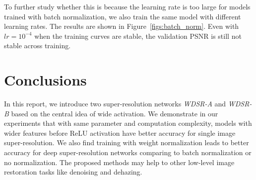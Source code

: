 \documentclass{article}
\begin{document}
To further study whether this is because the learning rate is too large for models trained with batch normalization, we also train the same model with different learning rates. The results are shown in Figure~\ref{figs:batch_norm}. Even with \(lr = 10^{-4}\) when the training curves are stable, the validation PSNR is still not stable across training.  
\section{Conclusions}

In this report, we introduce two super-resolution networks \textit{WDSR-A} and \textit{WDSR-B} based on the central idea of wide activation. We demonstrate in our experiments that with same parameter and computation complexity, models with wider features before ReLU activation have better accuracy for single image super-resolution. We also find training with weight normalization leads to better accuracy for deep super-resolution networks comparing to batch normalization or no normalization. The proposed methods may help to other low-level image restoration tasks like denoising and dehazing.

\printbibliography
\end{document}
